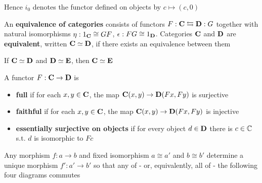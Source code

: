 \documentclass[11pt]{article}
\begin{document}
Hence \(i_0\) denotes the functor defined on objects by \(c\mapsto(c,0)\)

\begin{definition}[]
An \textbf{equivalence of categories} consists of functors \(F:\operatorname{\textbf{C}}\leftrightarrows \operatorname{\textbf{D}}:G\) together with
natural isomorphisms \(\eta:1_{\operatorname{\textbf{C}}}\cong GF\), \(\epsilon:FG\cong 1_{\operatorname{\textbf{D}}}\). Categories \(\operatorname{\textbf{C}}\)  and \(\operatorname{\textbf{D}}\) are
\textbf{equivalent}, written \(\operatorname{\textbf{C}}\simeq\operatorname{\textbf{D}}\), if there exists an equivalence between them
\end{definition}

\begin{lemma}[]
If \(\operatorname{\textbf{C}}\simeq\operatorname{\textbf{D}}\) and \(\operatorname{\textbf{D}}\simeq\operatorname{\textbf{E}}\), then \(\operatorname{\textbf{C}}\simeq\operatorname{\textbf{E}}\)
\end{lemma}

\begin{definition}[]
A functor \(F:\operatorname{\textbf{C}}\to\operatorname{\textbf{D}}\) is
\begin{itemize}
\item \textbf{full} if for each \(x,y\in\operatorname{\textbf{C}}\), the map \(\operatorname{\textbf{C}}(x,y)\to \operatorname{\textbf{D}}(Fx,Fy)\) is surjective
\item \textbf{faithful} if for each \(x,y\in\operatorname{\textbf{C}}\), the map \(\operatorname{\textbf{C}}(x,y)\to\operatorname{\textbf{D}}(Fx,Fy)\) is injective
\item \textbf{essentially surjective on objects} if for every object \(d\in\operatorname{\textbf{D}}\) there is \(c\in\mathbb{C}\) s.t. \(d\) is
isomorphic to \(Fc\)
\end{itemize}
\end{definition}

\begin{lemma}[]
\label{lemma1.5.10}
Any morphism \(f:a\to b\) and fixed isomorphism \(a\cong a'\) and \(b\cong b'\) determine a unique
morphism \(f':a'\to b'\) so that any of - or, equivalently, all of - the following four diagrams
commutes
\begin{center}\end{center}
\end{lemma}
\end{document}
